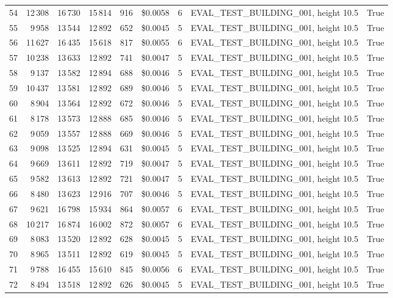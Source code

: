 \documentclass[a4paper,11pt]{article}
\begin{document}
\begin{table}[ht]
\begin{tabular}{r r r r r r r p{3cm} l}
54 & 12\,308 & 16\,730 & 15\,814 & 916 & \$0.0058 & 6 & EVAL\_TEST\_BUILDING\_001, height 10.5 & True \\
55 & 9\,958 & 13\,544 & 12\,892 & 652 & \$0.0045 & 5 & EVAL\_TEST\_BUILDING\_001, height 10.5 & True \\
56 & 11\,627 & 16\,435 & 15\,618 & 817 & \$0.0055 & 6 & EVAL\_TEST\_BUILDING\_001, height 10.5 & True \\
57 & 10\,238 & 13\,633 & 12\,892 & 741 & \$0.0047 & 5 & EVAL\_TEST\_BUILDING\_001, height 10.5 & True \\
58 & 9\,137 & 13\,582 & 12\,894 & 688 & \$0.0046 & 5 & EVAL\_TEST\_BUILDING\_001, height 10.5 & True \\
59 & 10\,437 & 13\,581 & 12\,892 & 689 & \$0.0046 & 5 & EVAL\_TEST\_BUILDING\_001, height 10.5 & True \\
60 & 8\,904 & 13\,564 & 12\,892 & 672 & \$0.0046 & 5 & EVAL\_TEST\_BUILDING\_001, height 10.5 & True \\
61 & 8\,178 & 13\,573 & 12\,888 & 685 & \$0.0046 & 5 & EVAL\_TEST\_BUILDING\_001, height 10.5 & True \\
62 & 9\,059 & 13\,557 & 12\,888 & 669 & \$0.0046 & 5 & EVAL\_TEST\_BUILDING\_001, height 10.5 & True \\
63 & 9\,098 & 13\,525 & 12\,894 & 631 & \$0.0045 & 5 & EVAL\_TEST\_BUILDING\_001, height 10.5 & True \\
64 & 9\,669 & 13\,611 & 12\,892 & 719 & \$0.0047 & 5 & EVAL\_TEST\_BUILDING\_001, height 10.5 & True \\
65 & 9\,582 & 13\,613 & 12\,892 & 721 & \$0.0047 & 5 & EVAL\_TEST\_BUILDING\_001, height 10.5 & True \\
66 & 8\,480 & 13\,623 & 12\,916 & 707 & \$0.0046 & 5 & EVAL\_TEST\_BUILDING\_001, height 10.5 & True \\
67 & 9\,621 & 16\,798 & 15\,934 & 864 & \$0.0057 & 6 & EVAL\_TEST\_BUILDING\_001, height 10.5 & True \\
68 & 10\,217 & 16\,874 & 16\,002 & 872 & \$0.0057 & 6 & EVAL\_TEST\_BUILDING\_001, height 10.5 & True \\
69 & 8\,083 & 13\,520 & 12\,892 & 628 & \$0.0045 & 5 & EVAL\_TEST\_BUILDING\_001, height 10.5 & True \\
70 & 8\,965 & 13\,511 & 12\,892 & 619 & \$0.0045 & 5 & EVAL\_TEST\_BUILDING\_001, height 10.5 & True \\
71 & 9\,788 & 16\,455 & 15\,610 & 845 & \$0.0056 & 6 & EVAL\_TEST\_BUILDING\_001, height 10.5 & True \\
72 & 8\,494 & 13\,518 & 12\,892 & 626 & \$0.0045 & 5 & EVAL\_TEST\_BUILDING\_001, height 10.5 & True \\

\end{tabular}
\end{table}
\end{document}
